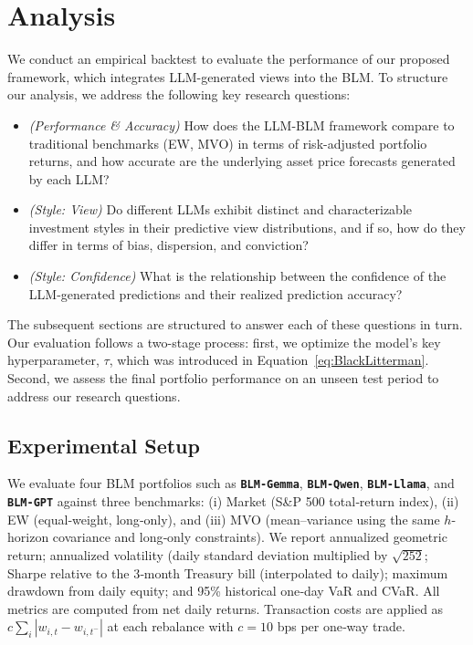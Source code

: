 \section{Analysis}

We conduct an empirical backtest to evaluate the performance of our proposed framework, which integrates LLM-generated views into the BLM. To structure our analysis, we address the following key research questions:

\begin{itemize}
    \item[\textbf{RQ1}] \textit{(Performance \& Accuracy)} How does the LLM-BLM framework compare to traditional benchmarks (EW, MVO) in terms of risk-adjusted portfolio returns, and how accurate are the underlying asset price forecasts generated by each LLM?
    \item[\textbf{RQ2}] \textit{(Style: View)} Do different LLMs exhibit distinct and characterizable investment styles in their predictive view distributions, and if so, how do they differ in terms of bias, dispersion, and conviction?
    \item[\textbf{RQ3}] \textit{(Style: Confidence)} What is the relationship between the confidence of the LLM-generated predictions and their realized prediction accuracy?
\end{itemize}

The subsequent sections are structured to answer each of these questions in turn. Our evaluation follows a two-stage process: first, we optimize the model's key hyperparameter, $\tau$, which was introduced in Equation~\ref{eq:BlackLitterman}. Second, we assess the final portfolio performance on an unseen test period to address our research questions.

\subsection{Experimental Setup}
We evaluate four BLM portfolios such as \textbf{\texttt{BLM‑Gemma}}, \textbf{\texttt{BLM‑Qwen}}, \textbf{\texttt{BLM‑Llama}}, and \textbf{\texttt{BLM‑GPT}} against three benchmarks: (i) Market (S\&P 500 total‑return index), (ii) EW (equal‑weight, long‑only), and (iii) MVO (mean–variance using the same $h$-horizon covariance and long‑only constraints). We report annualized geometric return; annualized volatility (daily standard deviation multiplied by $\sqrt{252}$; Sharpe relative to the 3‑month Treasury bill (interpolated to daily); maximum drawdown from daily equity; and 95\% historical one‑day VaR and CVaR. All metrics are computed from net daily returns. Transaction costs are applied as $c\sum_i |w_{i,t}-w_{i,t^-}|$ at each rebalance with $c=10$ bps per one‑way trade.

